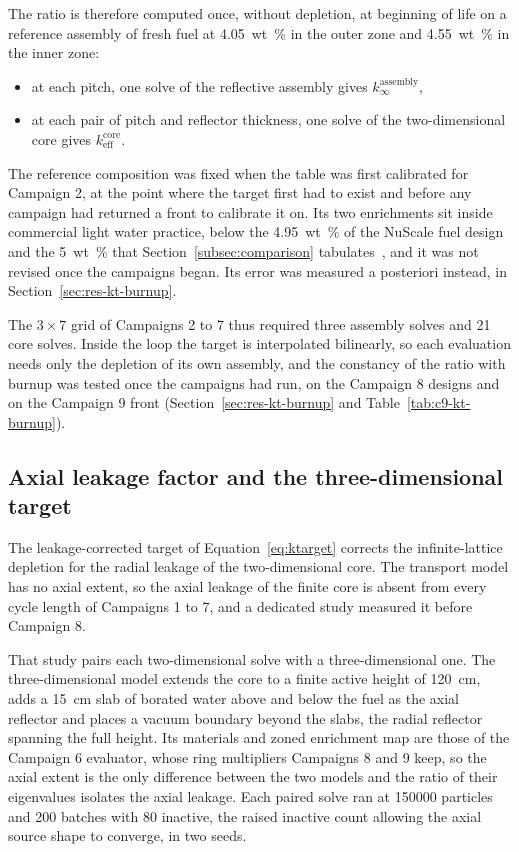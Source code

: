 The ratio is therefore computed once, without depletion, at beginning
of life on a reference assembly of fresh fuel at \SI{4.05}{wt\%} in
the outer zone and \SI{4.55}{wt\%} in the inner zone:

\begin{itemize}
  \item at each pitch, one solve of the reflective assembly gives
        $k_\infty^\mathrm{assembly}$,

  \item at each pair of pitch and reflector thickness, one solve of the
        two-dimensional core gives $k_\mathrm{eff}^\mathrm{core}$.
\end{itemize}

The reference composition was fixed when the table was first
calibrated for Campaign 2, at the point where the target first had to
exist and before any campaign had returned a front to calibrate it on.
Its two enrichments sit inside commercial light water practice, below
the \SI{4.95}{wt\%} of the NuScale fuel design and the \SI{5}{wt\%}
that Section~\ref{subsec:comparison}
tabulates~\cite{nuscale_htp2_2017,iaea_smr_2024}, and it was not revised
once the campaigns began. Its error was measured a posteriori instead, in
Section~\ref{sec:res-kt-burnup}.

The $3\times7$ grid of Campaigns 2 to 7 thus required three assembly
solves and 21 core solves. Inside the loop the target is interpolated
bilinearly, so each evaluation needs only the depletion of its own
assembly, and the constancy of the ratio with burnup was tested once
the campaigns had run, on the Campaign 8 designs and on the Campaign 9
front (Section~\ref{sec:res-kt-burnup} and
Table~\ref{tab:c9-kt-burnup}).

\subsection{Axial leakage factor and the three-dimensional target}
\label{sec:meth-lax}

The leakage-corrected target of Equation~\eqref{eq:ktarget} corrects the
infinite-lattice depletion for the radial leakage of the
two-dimensional core. The transport model has no axial extent, so the
axial leakage of the finite core is absent from every cycle length of
Campaigns 1 to 7, and a dedicated study measured it before Campaign 8.

That study pairs each two-dimensional solve with a three-dimensional
one. The three-dimensional model extends the core to a finite active
height of \SI{120}{cm}, adds a \SI{15}{cm} slab of borated water above
and below the fuel as the axial reflector and places a vacuum boundary
beyond the slabs, the radial reflector spanning the full height. Its
materials and zoned enrichment map are those of the Campaign 6
evaluator, whose ring multipliers Campaigns 8 and 9 keep, so the axial
extent is the only difference between the two models and the ratio of
their eigenvalues isolates the axial leakage. Each paired
solve ran at \num{150000} particles and 200 batches with 80 inactive,
the raised inactive count allowing the axial source shape to converge,
in two seeds.

